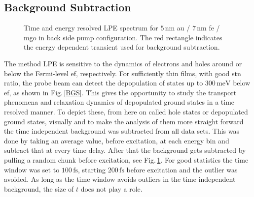 \documentclass[a4paper,12pt,twoside]{article}
\begin{document}
        \subsection{Background Subtraction}
            \label{BGSchap}
            	\begin{figure}[H]
		\caption{Time and energy resolved LPE spectrum for $5\,\mathrm{nm}$ \gls{au} / $7\,\mathrm{nm}$ \gls{fe} / \gls{mgo} in back side pump configuration. The red rectangle indicates the energy dependent transient used for background subtraction.}
	    	\label{setfermi}
	\end{figure}
The method \gls{LPE} is sensitive to the dynamics of electrons and holes around or below the Fermi-level \gls{ef}, respectively. For sufficiently thin films, with good \gls{stn} ratio, the probe beam can detect the depopulation of states up to $300\,\mathrm{meV}$ below \gls{ef}, as shown in Fig.\,\ref{BGS}. This gives the opportunity to study the transport phenomena and relaxation dynamics of depopulated ground states in a time resolved manner. To depict these, from here on called hole states or depopulated ground states, visually and to make the analysis of them more straight forward the time independent background was subtracted from all data sets. This was done by taking an average value, before excitation, at each energy bin and subtract that at every time delay. After that the background gets subtracted by pulling a random chunk before excitation, see Fig.\,\ref{setfermi}. For good statistics the time window was set to $100\,\mathrm{fs}$, starting $200\,\mathrm{fs}$ before excitation and the outlier was avoided. As long as the time window avoids outliers in the time independent background, the size of \textDelta $t$  does not play a role.
\end{document}

